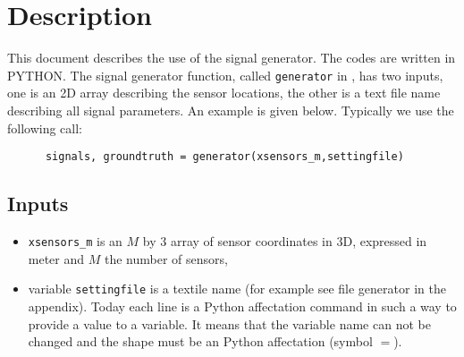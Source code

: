 \documentclass[a4paper, 10pt]{report}
\def\ttb{\tt\color{blue}}
\def\ttr{\tt\color{red}}
\def\python{PYTHON}%
\begin{document}
 \sloppy
 
\tableofcontents
\section{Description}
This document describes the use of the signal generator. The codes are written in \python. The signal generator function, called {\ttr generator} in {\ttb{}}, has two inputs, one is an 2D array describing the sensor locations, the other is a text file name describing all signal parameters. An example is given below. Typically we use the following call:
\begin{verbatim}
      signals, groundtruth = generator(xsensors_m,settingfile)
\end{verbatim}

\subsection {Inputs}
\begin{itemize}
\item
{\ttr xsensors\_m} is an $M$ by $3$ array of sensor coordinates in 3D, expressed in meter and $M$ the number of sensors,

\item
variable {\ttr settingfile} is a textile name (for example see file {\ttb{}} generator in the appendix). Today each line is a Python affectation command in such a way to provide a value to a variable. It means that the variable name can not be changed and the shape must be an Python affectation (symbol $=$).
\end{itemize}
\end{document}
